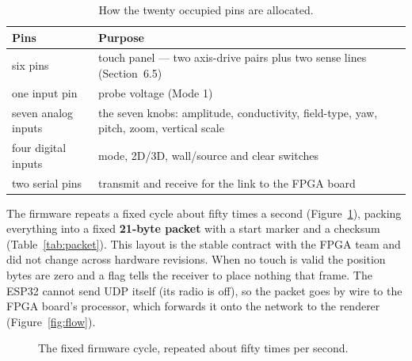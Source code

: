 \documentclass[11pt]{report}
\begin{document}
\begin{table}[ht]
\centering
\renewcommand{\arraystretch}{1.25}
\begin{tabularx}{\textwidth}{@{}>{\raggedright\arraybackslash}p{3.1cm} >{\raggedright\arraybackslash}X@{}}
\toprule
\textbf{Pins} & \textbf{Purpose} \\
\midrule
six pins & touch panel --- two axis-drive pairs plus two sense lines (Section~6.5) \\
one input pin & probe voltage (Mode 1) \\
seven analog inputs & the seven knobs: amplitude, conductivity, field-type, yaw, pitch, zoom, vertical scale \\
four digital inputs & mode, 2D/3D, wall/source and clear switches \\
two serial pins & transmit and receive for the link to the FPGA board \\
\bottomrule
\end{tabularx}
\caption{How the twenty occupied pins are allocated.}
\label{tab:pins}
\end{table}

The firmware repeats a fixed cycle about fifty times a second (Figure~\ref{fig:loop}), packing everything into a fixed \textbf{21-byte packet} with a start marker and a checksum (Table~\ref{tab:packet}). This layout is the stable contract with the FPGA team and did not change across hardware revisions. When no touch is valid the position bytes are zero and a flag tells the receiver to place nothing that frame. The ESP32 cannot send UDP itself (its radio is off), so the packet goes by wire to the FPGA board's processor, which forwards it onto the network to the renderer (Figure~\ref{fig:flow}).

\begin{figure}[ht]
\centering
{}
\caption{The fixed firmware cycle, repeated about fifty times per second.}
\label{fig:loop}
\end{figure}
\end{document}
